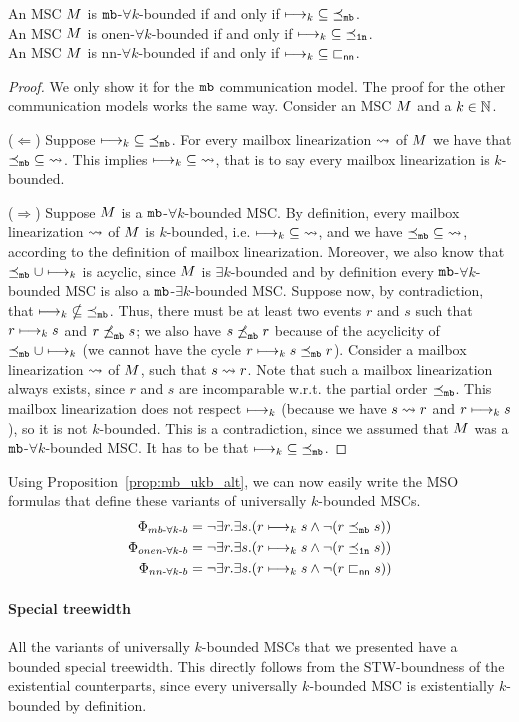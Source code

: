 \begin{proposition}\label{prop:mb_ukb_alt}
	An MSC $M$ is $\mathtt{mb}$-$\forall k$-bounded if and only if $\longmapsto_k \;\subseteq\; \preceq_{\mathtt{mb}}$.\\
	An MSC $M$ is onen-$\forall k$-bounded if and only if $\longmapsto_k \;\subseteq\; \preceq_{\mathtt{1n}}$.\\
	An MSC $M$ is nn-$\forall k$-bounded if and only if $\longmapsto_k \;\subseteq\; \sqsubset_{\mathsf{nn}}$.
\end{proposition}
\begin{proof}
	We only show it for the $\mathtt{mb}$ communication model. The proof for the other communication models works the same way. Consider an MSC $M$ and a $k \in \mathbb{N}$.
	
	($\Leftarrow$) Suppose $\longmapsto_k \;\subseteq\; \preceq_{\mathtt{mb}}$. For every mailbox linearization $\rightsquigarrow$ of $M$ we have that $\preceq_{\mathtt{mb}} \;\subseteq\; \rightsquigarrow$. This implies $\longmapsto_k \;\subseteq\; \rightsquigarrow$, that is to say every mailbox linearization is $k$-bounded.
	
	($\Rightarrow$) Suppose $M$ is a $\mathtt{mb}$-$\forall k$-bounded MSC. By definition, every mailbox linearization $\rightsquigarrow$ of $M$ is $k$-bounded, i.e. $\longmapsto_k \;\subseteq\; \rightsquigarrow$, and we have $\preceq_{\mathtt{mb}} \;\subseteq\; \rightsquigarrow$, according to the definition of mailbox linearization. Moreover, we also know that $\preceq_{\mathtt{mb}} \cup \longmapsto_k$ is acyclic, since $M$ is $\exists k$-bounded and by definition every $\mathtt{mb}$-$\forall k$-bounded MSC is also a $\mathtt{mb}$-$\exists k$-bounded MSC. Suppose now, by contradiction, that $\longmapsto_k \;\nsubseteq\; \preceq_{\mathtt{mb}}$. Thus, there must be at least two events $r$ and $s$ such that $r \longmapsto_k s$ and $r \;{\not\preceq}_{\mathtt{mb}}\; s$; we also have $s \;{\not\preceq}_{\mathtt{mb}}\; r$ because of the acyclicity of $\preceq_{\mathtt{mb}} \cup \longmapsto_k$ (we cannot have the cycle $r \longmapsto_k s \preceq_{\mathtt{mb}} r$). Consider a mailbox linearization $\rightsquigarrow$  of $M$, such that $s \rightsquigarrow r$. Note that such a mailbox linearization always exists, since $r$ and $s$ are incomparable w.r.t. the partial order $\preceq_{\mathtt{mb}}$. This mailbox linearization does not respect $\longmapsto_k$ (because we have $s \rightsquigarrow r$ and $r \longmapsto_k s$), so it is not $k$-bounded. This is a contradiction, since we assumed that $M$ was a $\mathtt{mb}$-$\forall k$-bounded MSC. It has to be that $\longmapsto_k \;\subseteq\; \preceq_{\mathtt{mb}}$.
\end{proof}

Using Proposition~\ref{prop:mb_ukb_alt}, we can now easily write the MSO formulas that define these variants of universally $k$-bounded MSCs.
\begin{align*}
	\Phi_{mb\text{-}\forall k\text{-}b} &= \neg \exists r.\exists s.(r \longmapsto_k s \wedge \neg(r \preceq_{\mathtt{mb}} s)) \\
	\Phi_{onen\text{-}\forall k\text{-}b} &= \neg \exists r.\exists s.(r \longmapsto_k s \wedge \neg(r \preceq_{\mathtt{1n}} s)) \\
	\Phi_{nn\text{-}\forall k\text{-}b} &= \neg \exists r.\exists s.(r \longmapsto_k s \wedge \neg(r \sqsubset_{\mathsf{nn}} s))
\end{align*}


\paragraph*{Special treewidth}

All the variants of universally $k$-bounded MSCs that we presented have a bounded special treewidth. This directly follows from the STW-boundness of the existential counterparts, since every universally $k$-bounded MSC is existentially $k$-bounded by definition.
